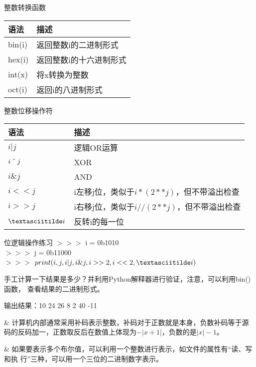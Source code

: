 \begin{frame}[fragile]{整数转换函数}
  \begin{center}
    \begin{tabular}{l | l}
      \toprule
      语法 & 描述 \\
      \midrule
      bin(i) & 返回整数i的二进制形式 \\ \hline
      hex(i) & 返回整数i的十六进制形式 \\ \hline
      int(x) & 将x转换为整数 \\ \hline
      oct(i) & 返回i的八进制形式 \\ 
      \bottomrule
    \end{tabular}
  \end{center}
\end{frame}

\begin{frame}[fragile]{整数位移操作符}
  \begin{center}
    \begin{tabular}{l | l}
      \toprule
      语法 & 描述 \\ 
      \midrule
      $i | j$  & 逻辑OR运算 \\ \hline
      $i \mathbin{\char`\^} j$ & XOR \\ \hline
      $i \& j$ & AND \\ \hline
      $i<<j$ & i左移j位，类似于$i*(2**j)$，但不带溢出检查 \\ \hline 
      $i>>j$ & i右移j位，类似于$i//(2**j)$，但不带溢出检查 \\ \hline
      $\textasciitilde i$ & 反转i的每一位 \\
      \bottomrule
    \end{tabular}
  \end{center}
\end{frame}

\begin{frame}[fragile]{位逻辑操作练习}
  $>>>$ i = 0b1010 \\
  $>>>$ j = 0b11000 \\

  $>>>$ $print(i,j,i|j, i\&j, i>>2, i<<2, \textasciitilde i)$

  手工计算一下结果是多少？并利用Python解释器进行验证，注意，可以利用bin()函数，
  查看结果的二进制形式。

  \pause

  输出结果：10 24 26 8 2 40 -11

  \pause

  \begin{easylist}
    & \small 计算机内部通常采用补码表示整数，补码对于正数就是本身，负数补码等于源
    码的反码加一，正数取反后在数值上体现为$-|x+1|$，负数的是$|x|-1$。

    & \small 如果要表示多个布尔值，可以利用一个整数进行表示，如文件的属性有``读、写和执
    行''三种，可以用一个三位的二进制数字表示。
  \end{easylist}
\end{frame}


